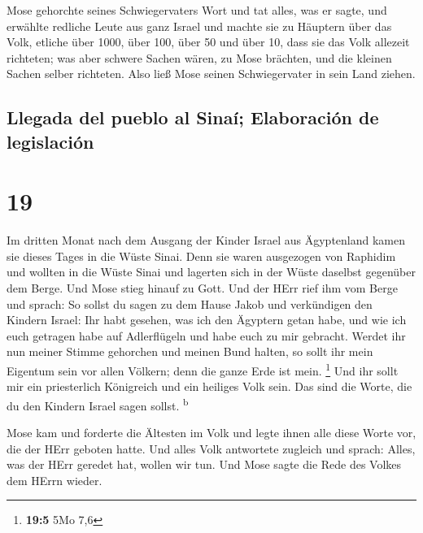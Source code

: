  Mose gehorchte seines Schwiegervaters Wort und tat
alles, was er sagte,  und erwählte redliche Leute aus
ganz Israel und machte sie zu Häuptern über das Volk, etliche über 1000,
über 100, über 50 und über 10,  dass sie das Volk
allezeit richteten; was aber schwere Sachen wären, zu Mose brächten, und
die kleinen Sachen selber richteten.  Also ließ Mose
seinen Schwiegervater in sein Land ziehen.

\hypertarget{llegada-del-pueblo-al-sinauxed-elaboraciuxf3n-de-legislaciuxf3n}{%
\subsection{Llegada del pueblo al Sinaí; Elaboración de
legislación}\label{llegada-del-pueblo-al-sinauxed-elaboraciuxf3n-de-legislaciuxf3n}}

\hypertarget{section-18}{%
\section{19}\label{section-18}}

 Im dritten Monat nach dem Ausgang der Kinder Israel aus
Ägyptenland kamen sie dieses Tages in die Wüste Sinai. 
Denn sie waren ausgezogen von Raphidim und wollten in die Wüste Sinai
und lagerten sich in der Wüste daselbst gegenüber dem Berge.
 Und Mose stieg hinauf zu Gott. Und der HErr rief ihm vom
Berge und sprach: So sollst du sagen zu dem Hause Jakob und verkündigen
den Kindern Israel:  Ihr habt gesehen, was ich den
Ägyptern getan habe, und wie ich euch getragen habe auf Adlerflügeln und
habe euch zu mir gebracht.  Werdet ihr nun meiner Stimme
gehorchen und meinen Bund halten, so sollt ihr mein Eigentum sein vor
allen Völkern; denn die ganze Erde ist mein. \footnote{\textbf{19:5} 5Mo
  7,6}  Und ihr sollt mir ein priesterlich Königreich und
ein heiliges Volk sein. Das sind die Worte, die du den Kindern Israel
sagen sollst. \textsuperscript{b}

 Mose kam und forderte die Ältesten im Volk und legte
ihnen alle diese Worte vor, die der HErr geboten hatte. 
Und alles Volk antwortete zugleich und sprach: Alles, was der HErr
geredet hat, wollen wir tun. Und Mose sagte die Rede des Volkes dem
HErrn wieder.

